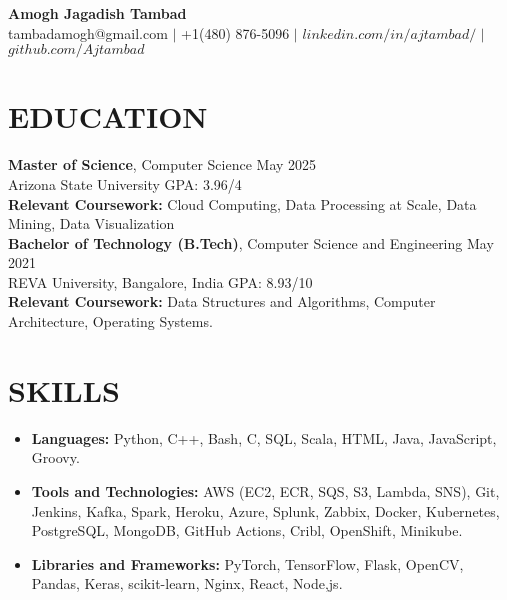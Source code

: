 \documentclass[a4paper,9pt]{extarticle}
\begin{document}
\pagestyle{empty}

\begin{center}
\textbf{\huge Amogh Jagadish Tambad}\\[2pt] %
tambadamogh@gmail.com \hspace{1mm} $|$ \hspace{1mm} +1(480) 876-5096  \hspace{1mm} $|$ \hspace{1mm} $linkedin.com/in/ajtambad/$ \hspace{1mm} $|$ \hspace{1mm} $github.com/Ajtambad$
\end{center}

\section*{EDUCATION}
\noindent
\textbf{Master of Science}, Computer Science \hfill May 2025 \\ %
Arizona State University
\hfill GPA: 3.96/4\\ %
\textbf{Relevant Coursework:} Cloud Computing, Data Processing at Scale, Data Mining, Data Visualization\\

\noindent
\textbf{Bachelor of Technology (B.Tech)}, Computer Science and Engineering \hfill May 2021 \\ %
REVA University, Bangalore, India \hfill GPA: 8.93/10\\ %
\textbf{Relevant Coursework:} Data Structures and Algorithms, Computer Architecture, Operating Systems.

\section*{SKILLS}
\begin{itemize}
    \item \textbf{Languages:} Python, C++, Bash, C, SQL, Scala, HTML, Java, JavaScript, Groovy. %
    \item \textbf{Tools and Technologies:} AWS (EC2, ECR, SQS, S3, Lambda, SNS), Git, Jenkins, Kafka, Spark, Heroku, Azure, Splunk, Zabbix, Docker, Kubernetes, PostgreSQL, MongoDB, GitHub Actions, Cribl, OpenShift, Minikube. %
    \item \textbf{Libraries and Frameworks:} PyTorch, TensorFlow, Flask, OpenCV, Pandas, Keras, scikit-learn, Nginx, React, Node,js.
\end{itemize}
\end{document}
